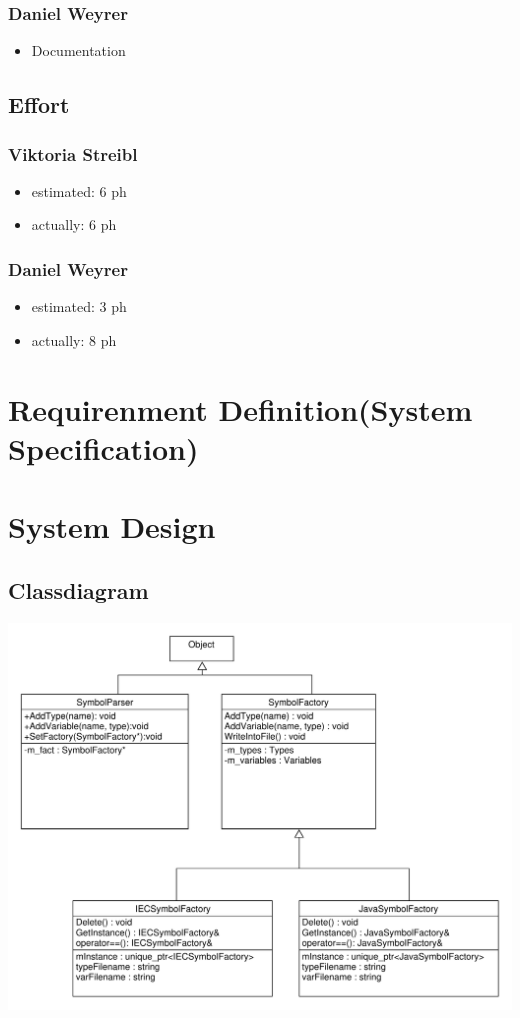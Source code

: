 \subsubsection{Daniel Weyrer}
\begin{itemize}
	\item Documentation
\end{itemize}

\subsection{Effort}

\subsubsection {Viktoria Streibl}
\begin{itemize}
	\item estimated: 6 ph 
	\item actually: 6 ph
\end{itemize}

\subsubsection {Daniel Weyrer}
\begin{itemize}
	\item estimated: 3 ph 
	\item actually: 8 ph
\end{itemize}

\section{Requirenment Definition(System Specification)}


\section{System Design}
\subsection{Classdiagram}
\includegraphics[scale=0.56, angle=90]{ClassDiagramm}

